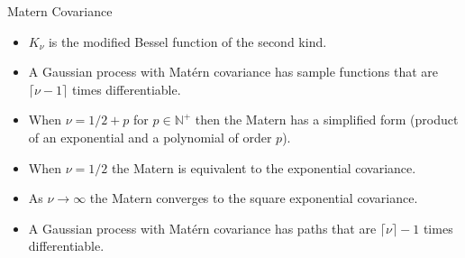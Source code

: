 \documentclass[11pt,ignorenonframetext,]{beamer}
\providecommand{\tightlist}{%
  \setlength{\itemsep}{0pt}\setlength{\parskip}{0pt}}
\begin{document}
\begin{frame}[t]{%
\protect\hypertarget{matern-covariance-1}{%
Matern Covariance}}

\begin{itemize}
\tightlist
\item
  \(K_\nu\) is the modified Bessel function of the second kind.
\end{itemize}

\vspace{1mm}

\begin{itemize}
\tightlist
\item
  A Gaussian process with Matérn covariance has sample functions that
  are \(\lceil \nu -1\rceil\) times differentiable.
\end{itemize}

\vspace{1mm}

\begin{itemize}
\tightlist
\item
  When \(\nu = 1/2 + p\) for \(p \in \mathbb{N}^+\) then the Matern has
  a simplified form (product of an exponential and a polynomial of order
  \(p\)).
\end{itemize}

\vspace{1mm}

\begin{itemize}
\tightlist
\item
  When \(\nu = 1/2\) the Matern is equivalent to the exponential
  covariance.
\end{itemize}

\vspace{1mm}

\begin{itemize}
\tightlist
\item
  As \(\nu \to \infty\) the Matern converges to the square exponential
  covariance.
\end{itemize}

\vspace{1mm}

\begin{itemize}
\tightlist
\item
  A Gaussian process with Matérn covariance has paths that are
  \(\lceil \nu \rceil -1\) times differentiable.
\end{itemize}

\end{frame}
\end{document}
